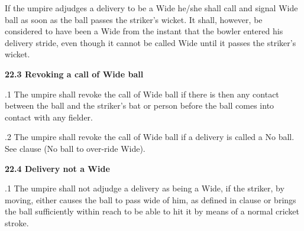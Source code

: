 \documentclass[12pt]{article}
\begin{document}
\vspace{\baselineskip}
\begin{adjustwidth}{0.0in}{0.17in}
{\fontsize{9pt}{10.8pt}\selectfont If the umpire adjudges a delivery to be a Wide he/she shall call and signal Wide ball as soon as the ball passes the striker’s wicket. It shall, however, be considered to have been a Wide from the instant that the bowler entered his delivery stride, even though it cannot be called Wide until it passes the striker’s wicket.\par}\par

\end{adjustwidth}


\vspace{\baselineskip}
{\fontsize{11pt}{13.2pt}\selectfont \textbf{22.3 \tabto{0.47in} Revoking a call of Wide ball}\par}\par


\vspace{\baselineskip}
\begin{adjustwidth}{0.5in}{0.19in}
{\fontsize{9pt}{10.8pt}.1 \tabto{0.49in} The umpire shall revoke the call of Wide ball if there is then any contact between the ball and the striker’s bat or person before the ball comes into contact with any fielder.\par}\par

\end{adjustwidth}


\vspace{\baselineskip}
\begin{adjustwidth}{0.5in}{0.22in}
{\fontsize{9pt}{10.8pt}.2 \tabto{0.49in} The umpire shall revoke the call of Wide ball if a delivery is called a No ball. See clause (No ball to over-ride Wide).\par}\par

\end{adjustwidth}


\vspace{\baselineskip}
{\fontsize{11pt}{13.2pt}\selectfont \textbf{22.4 \tabto{0.47in} Delivery not a Wide}\par}\par


\vspace{\baselineskip}
\begin{adjustwidth}{0.5in}{0.08in}
{\fontsize{9pt}{10.8pt}.1 \tabto{0.49in} The umpire shall not adjudge a delivery as being a Wide, if the striker, by moving, either causes the ball to pass wide of him, as defined in clause or brings the ball sufficiently within reach to be able to hit it by means of a normal cricket stroke.\par}\par

\end{adjustwidth}
\end{document}
